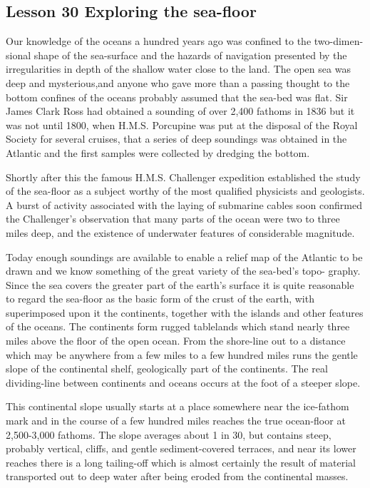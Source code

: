 \documentclass[kindlepaper]{BHCexam4kindle}
\begin{document}
\subsection{Lesson 30
Exploring the sea-floor}
\par
Our knowledge of the oceans a hundred years ago was confined to the two-dimen-
sional shape of the sea-surface and the hazards of navigation presented by the
irregularities in depth of the shallow water close to the land. The open sea was
deep and mysterious,and anyone who gave more than a passing thought to the
bottom confines of the oceans probably assumed that the sea-bed was flat. Sir
James Clark Ross had obtained a sounding of over 2,400 fathoms in 1836 but
it was not until 1800, when H.M.S. Porcupine was put at the disposal of the
Royal Society for several cruises, that a series of deep soundings was obtained
in the Atlantic and the first samples were collected by dredging the bottom.
\par
Shortly after this the famous H.M.S. Challenger expedition established the study
of the sea-floor as a subject worthy of the most qualified physicists and geologists.
A burst of activity associated with the laying of submarine cables soon confirmed
the Challenger's observation that many parts of the ocean were two to three miles
deep, and the existence of underwater features of considerable magnitude.
\par
Today enough soundings are available to enable a relief map of the Atlantic to
be drawn and we know something of the great variety of the sea-bed's topo-
graphy. Since the sea covers the greater part of the earth's surface it is quite
reasonable to regard the sea-floor as the basic form of the crust of the earth, with
superimposed upon it the continents, together with the islands and other features
of the oceans. The continents form rugged tablelands which stand nearly three
miles above the floor of the open ocean. From the shore-line out to a distance
which may be anywhere from a few miles to a few hundred miles runs the gentle
slope of the continental shelf, geologically part of the continents. The real
dividing-line between continents and oceans occurs at the foot of a steeper slope.
\par
This continental slope usually starts at a place somewhere near the ice-fathom
mark and in the course of a few hundred miles reaches the true ocean-floor at
2,500-3,000 fathoms. The slope averages about 1 in 30, but contains steep,
probably vertical, cliffs, and gentle sediment-covered terraces, and near its lower
reaches there is a long tailing-off which is almost certainly the result of material
transported out to deep water after being eroded from the continental masses.
\clearpage
\end{document}
